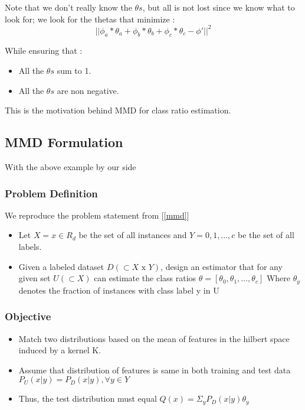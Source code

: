 Note that we don't really know the $\theta s$, but all is not lost since we know what to look for; 
we look for the thetas that minimize : 
\begin{equation}
 ||\phi_a * \theta_a + \phi_b * \theta_b + \phi_c * \theta_c  - \phi'||^2
\end{equation}

While ensuring that  :
\begin{itemize}
 \item All the $\theta s$ sum to 1.
 \item All the $\theta s$ are non negative.
\end{itemize}

This is the motivation behind MMD for class ratio estimation.
\subsection{MMD Formulation}

With the above example by our side
\subsubsection{Problem Definition}
We reproduce the problem statement from [\ref{mmd}]
 \begin{itemize}
  \item  Let $X = {x \in R_d }$ be the set of all instances and 
  $Y = {0, 1, . . . , c}$ be the  set of all labels.
 \medskip
\item Given a labeled dataset $D(\subset X\text{ x } Y)$, design an estimator that for any given set
$U (\subset X )$ can estimate the class ratios $\theta = [\theta_0 , \theta_1 , . . . , \theta_c ]$
Where  $\theta_y$ denotes the fraction of instances with class label y in U 
 \end{itemize}

\subsubsection{Objective}
\begin{itemize}
  \item Match two distributions based on the mean of features in the hilbert space induced by a kernel K. \medskip
  \item Assume that distribution of features is same in both training and test data
    $P_U (x|y) = P_D (x|y), \forall y \in Y$ \medskip
  \item Thus, the test distribution must equal $Q(x) = \Sigma_{y} P_D (x|y)\theta_y$  \medskip
 \end{itemize}
 
